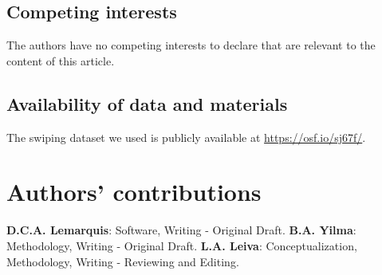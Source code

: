 \documentclass[sn-mathphys, pdflatex]{sn-jnl}
\begin{document}
\subsection*{Competing interests}
The authors have no competing interests to declare that are relevant to the content of this article.

\subsection*{Availability of data and materials}
The swiping dataset we used is publicly available at \url{https://osf.io/sj67f/}.

\section*{Authors' contributions}
\textbf{D.C.A. Lemarquis}: Software, Writing - Original Draft.
\textbf{B.A. Yilma}: Methodology, Writing - Original Draft.
\textbf{L.A. Leiva}: Conceptualization, Methodology, Writing - Reviewing and Editing.

\end{document}
